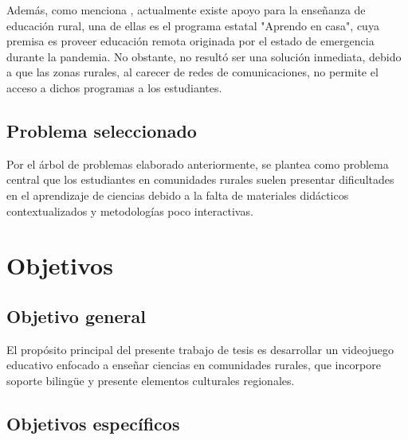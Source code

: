 Además, como menciona \cite{renato_educacion}, actualmente existe apoyo para la enseñanza de educación rural, una de ellas es el programa estatal "Aprendo en casa", cuya premisa es proveer educación remota originada por el estado de emergencia durante la pandemia. No obstante, no resultó ser una solución inmediata, debido a que las zonas rurales, al carecer de redes de comunicaciones, no permite el acceso a dichos programas a los estudiantes. 

\subsection{Problema seleccionado}

Por el árbol de problemas elaborado anteriormente, se plantea como problema central que los estudiantes en comunidades rurales suelen presentar dificultades en el aprendizaje de ciencias debido a la falta de materiales didácticos contextualizados y metodologías poco interactivas.

\section{Objetivos}

\subsection{Objetivo general}

El propósito principal del presente trabajo de tesis es desarrollar un videojuego educativo enfocado a enseñar ciencias en comunidades rurales, que incorpore soporte bilingüe y presente elementos culturales regionales.

\subsection{Objetivos específicos}

